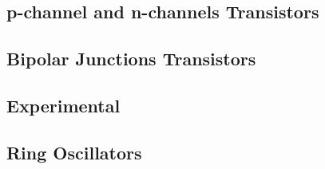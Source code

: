 
\subsection{p-channel and n-channels Transistors}


\subsection{Bipolar Junctions Transistors}

\subsection{Experimental}


\subsection{Ring Oscillators}

\clearpage
